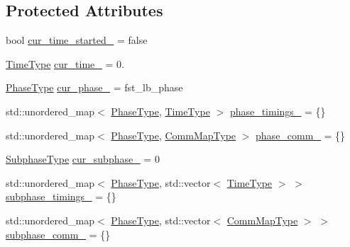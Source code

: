 \subsection*{Protected Attributes}
\begin{DoxyCompactItemize}
\item 
bool \hyperlink{structvt_1_1elm_1_1_element_stats_acff21e309c927473a0982162cce3d90b}{cur\+\_\+time\+\_\+started\+\_\+} = false
\item 
\hyperlink{namespacevt_a876a9d0cd5a952859c72de8a46881442}{Time\+Type} \hyperlink{structvt_1_1elm_1_1_element_stats_a640cbac2711a3918c75658665ea17956}{cur\+\_\+time\+\_\+} = 0.
\item 
\hyperlink{namespacevt_a46ce6733d5cdbd735d561b7b4029f6d7}{Phase\+Type} \hyperlink{structvt_1_1elm_1_1_element_stats_abf8772ed13a418246a6f7e33309f3374}{cur\+\_\+phase\+\_\+} = fst\+\_\+lb\+\_\+phase
\item 
std\+::unordered\+\_\+map$<$ \hyperlink{namespacevt_a46ce6733d5cdbd735d561b7b4029f6d7}{Phase\+Type}, \hyperlink{namespacevt_a876a9d0cd5a952859c72de8a46881442}{Time\+Type} $>$ \hyperlink{structvt_1_1elm_1_1_element_stats_a7f9571931802777ac73afa0c0d8976f5}{phase\+\_\+timings\+\_\+} = \{\}
\item 
std\+::unordered\+\_\+map$<$ \hyperlink{namespacevt_a46ce6733d5cdbd735d561b7b4029f6d7}{Phase\+Type}, \hyperlink{namespacevt_1_1elm_a38487cb8896b9b4763efa9022fab560e}{Comm\+Map\+Type} $>$ \hyperlink{structvt_1_1elm_1_1_element_stats_ab44d8162968d9310df926c7312d49c1d}{phase\+\_\+comm\+\_\+} = \{\}
\item 
\hyperlink{namespacevt_ae78cbfdf1e57470e33eedb074f2beeba}{Subphase\+Type} \hyperlink{structvt_1_1elm_1_1_element_stats_ab493bd6bcb711e4ac1e68d7f94249c30}{cur\+\_\+subphase\+\_\+} = 0
\item 
std\+::unordered\+\_\+map$<$ \hyperlink{namespacevt_a46ce6733d5cdbd735d561b7b4029f6d7}{Phase\+Type}, std\+::vector$<$ \hyperlink{namespacevt_a876a9d0cd5a952859c72de8a46881442}{Time\+Type} $>$ $>$ \hyperlink{structvt_1_1elm_1_1_element_stats_ae1b1ff4ab1b86011d73bfc4f1a6fc2aa}{subphase\+\_\+timings\+\_\+} = \{\}
\item 
std\+::unordered\+\_\+map$<$ \hyperlink{namespacevt_a46ce6733d5cdbd735d561b7b4029f6d7}{Phase\+Type}, std\+::vector$<$ \hyperlink{namespacevt_1_1elm_a38487cb8896b9b4763efa9022fab560e}{Comm\+Map\+Type} $>$ $>$ \hyperlink{structvt_1_1elm_1_1_element_stats_a8821119818d8ab253ebded8869b5e693}{subphase\+\_\+comm\+\_\+} = \{\}
\end{DoxyCompactItemize}
